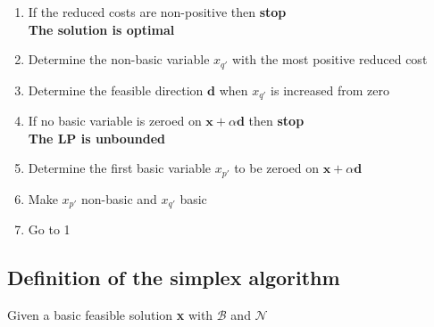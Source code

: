 \documentclass[11pt,a4paper]{article}
\begin{document}
\begin{enumerate}

    \item If the reduced costs are non-positive then \textbf{stop} \\
        \textbf{The solution is optimal}

    \item Determine the non-basic variable $x_{q'}$ with the most positive reduced cost

    \item Determine the feasible direction $\textbf{d}$ when $x_{q'}$ is increased from zero

    \item If no basic variable is zeroed on $\textbf{x} + \alpha \textbf{d}$ then \textbf{stop} \\
        \textbf{The LP is unbounded}

    \item Determine the first basic variable $x_{p'}$ to be zeroed on
        $\textbf{x} + \alpha \textbf{d}$

    \item Make $x_{p'}$ non-basic and $x_{q'}$ basic

    \item Go to 1

\end{enumerate}

\subsection*{Definition of the simplex algorithm}
Given a basic feasible solution \textbf{x} with $\mathcal{B}$ and $\mathcal{N}$
\end{document}
